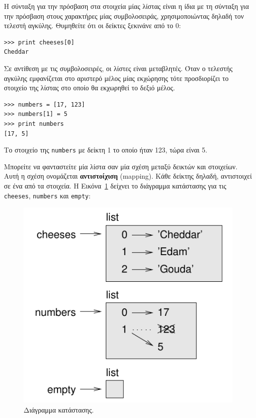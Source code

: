 \documentclass[10pt]{book}
\begin{document}
Η σύνταξη για την πρόσβαση στα στοιχεία μίας λίστας είναι η ίδια με τη σύνταξη για την πρόσβαση στους χαρακτήρες μίας συμβολοσειράς, χρησιμοποιώντας δηλαδή τον τελεστή αγκύλης. Θυμηθείτε ότι οι δείκτες ξεκινάνε από το 0:

\begin{verbatim}
>>> print cheeses[0]
Cheddar
\end{verbatim}
%

Σε αντίθεση με τις συμβολοσειρές, οι λίστες είναι μεταβλητές. Όταν ο τελεστής αγκύλης εμφανίζεται στο αριστερό μέλος μίας εκχώρησης τότε προσδιορίζει το στοιχείο της λίστας στο οποίο θα εκχωρηθεί το δεξιό μέλος.

\begin{verbatim}
>>> numbers = [17, 123]
>>> numbers[1] = 5
>>> print numbers
[17, 5]
\end{verbatim}
%

Το στοιχείο της {\tt numbers} με δείκτη 1 το οποίο ήταν 123, τώρα είναι 5.

Μπορείτε να φανταστείτε μία λίστα σαν μία σχέση μεταξύ δεικτών και στοιχείων. Αυτή η σχέση ονομάζεται {\bf αντιστοίχιση} (mapping). Κάθε δείκτης δηλαδή, αντιστοιχεί σε ένα από τα στοιχεία. Η Εικόνα~\ref{fig.liststate} δείχνει το διάγραμμα κατάστασης για τις {\tt cheeses}, {\tt numbers} και {\tt empty}:

\begin{figure}
\centerline
{\includegraphics[scale=0.8]{figs/liststate.pdf}}
\caption{Διάγραμμα κατάστασης.}
\label{fig.liststate}
\end{figure}
\end{document}
